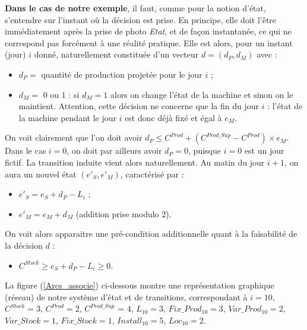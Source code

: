 \textbf{Dans le cas de notre exemple}, il faut, comme pour la notion d'état, s'entendre sur l'instant où la décision est prise. En principe, elle doit l'être immédiatement après la prise de photo \textit{Etat}, et de façon instantanée, ce qui ne correspond pas forcément à une réalité pratique.  Elle est alors, pour un instant (jour) $i$ donné,  naturellement constituée d'un vecteur $d = (d_P, d_M)$ avec :
\begin{itemize}[label=$\square$]
	\item	$d_P =$ quantité de production projetée pour le jour $i$ ;
	\item	$d_M =$ 0 ou 1 : si $d_M = 1$ alors on change l'état de la machine et sinon on le maintient. Attention, cette décision ne concerne que la fin du jour $i$ : l'état de la machine pendant le jour $i$ est donc déjà fixé et égal à $e_M$.
\end{itemize}
On voit clairement que l'on doit avoir $d_P \leq C^{Prod} + (C^{Prod\_Sup} - C^{Prod})\times e_M$. Dans le cas $i = 0$, on doit par ailleurs avoir $d_P = 0$, puisque $i = 0$ est un jour fictif.
La transition induite vient alors naturellement. Au matin du jour $i+1$, on aura un nouvel état $(e'_S, e'_M)$, caractérisé par :
\begin{itemize}[label=$\square$]
	\item	$e'_S = e_S + d_P - L_i $ ;
	\item	$e'_M = e_M + d_M$ (addition prise modulo 2).
\end{itemize}
On voit alors apparaitre une pré-condition additionnelle quant à la faisabilité de la décision $d$ :
\begin{itemize}[label=$\square$]
	\item	$C^{Stock} \geq e_S + d_P - L_i \geq 0$.
\end{itemize}

La figure (\ref{Arcs_associe}) ci-dessous montre une représentation graphique (réseau) de notre système d'état et de transitions, correspondant à $i = 10$, $C^{Stock} = 3$, $C^{Prod} = 2$, $C^{Prod\_Sup}$ = 4, $L_{10} = 3$, $Fix\_Prod_{10} = 3 $, $Var\_Prod_{10}= 2$, $Var\_Stock = 1$, $Fix\_Stock = 1$, $Install_{10}  = 5$,   $Loc_{10}= 2$.

